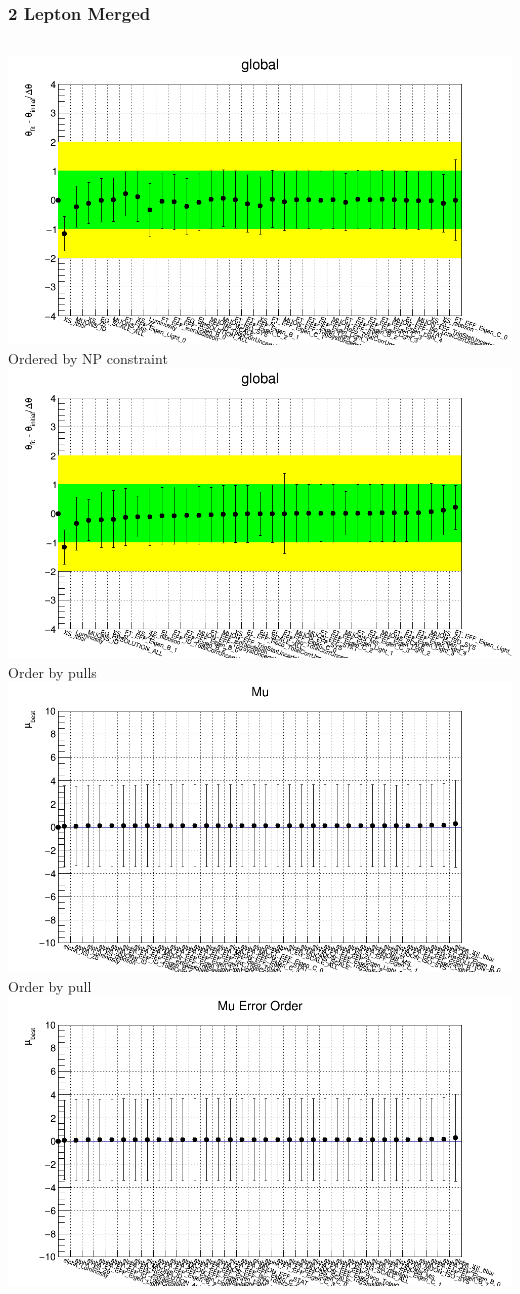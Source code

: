 \documentclass{beamer}
\begin{document}
\begin{frame}
\frametitle{2 Lepton Merged}
\begin{columns}[t]
\centering
\includegraphics[width=0.8\linewidth]{pics/pull_2lep_merge_order_constraint.png}\\
\tiny{ Ordered by NP constraint }\\
\includegraphics[width=0.8\linewidth]{pics/pull_2lep_merge_order_pull.png}\\
\tiny{ Order by pulls  }\\
\centering
\includegraphics[width=0.8\linewidth]{pics/mu_2lep_merge_order_pull.png}\\
\tiny{ Order by pull }\\
\includegraphics[width=0.8\linewidth]{pics/mu_2lep_merge_order_constraint.png}\\ 

\end{columns}
\end{frame}
\end{document}
